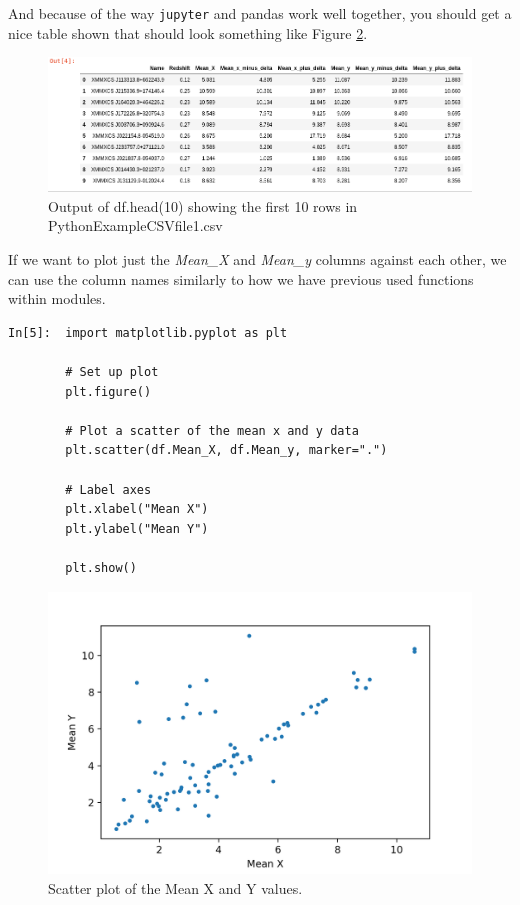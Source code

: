 And because of the way \texttt{jupyter} and pandas work well together, you should get a nice table shown that should look something like Figure \ref{fig:df_head}.

\begin{figure}[H]
	\centering
	\includegraphics[scale=0.45]{Pictures/df_head.png}
\caption{Output of df.head(10) showing the first 10 rows in PythonExampleCSVfile1.csv}
\label{fig:df_head}
\end{figure}

\newpage

If we want to plot just the \textit{Mean\_X} and \textit{Mean\_y} columns against each other, we can use the column names similarly to how we have previous used functions within modules.

\begin{lstlisting}[style=PY]
In[5]:  import matplotlib.pyplot as plt

        # Set up plot
        plt.figure()
        
        # Plot a scatter of the mean x and y data
        plt.scatter(df.Mean_X, df.Mean_y, marker=".")
        
        # Label axes
        plt.xlabel("Mean X")
        plt.ylabel("Mean Y")
        
        plt.show()
\end{lstlisting}

\begin{figure}[H]
	\centering
	\includegraphics[scale=1]{Pictures/Week6_x_v_y.png}
\caption{Scatter plot of the Mean X and Y values.}
\label{fig:df_head}
\end{figure}

